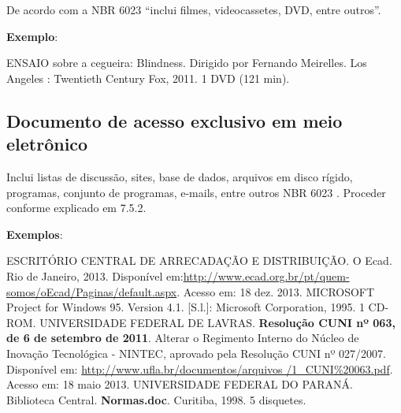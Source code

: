 De acordo com a NBR 6023 \cite[p.10]{NBR6023:2002} ``inclui filmes, videocassetes, DVD, entre outros''. 

\begin{flushleft}
\begin{singlespace}
\end{singlespace}
\end{flushleft}

\begin{exemplomanual}
\textbf{Exemplo}:\\
\begin{singlespace}
ENSAIO sobre a cegueira: Blindness. Dirigido por Fernando Meirelles. Los Angeles : Twentieth Century Fox, 2011. 1 DVD (121 min).
\end{singlespace}
\end{exemplomanual}


\subsection{Documento de acesso exclusivo em meio eletrônico}

Inclui listas de discussão, sites, base de dados, arquivos em disco rígido, programas, conjunto de programas, e-mails, entre outros NBR 6023 \cite{NBR6023:2002}. Proceder conforme explicado em 7.5.2.

\begin{flushleft}
\begin{singlespace}
\end{singlespace}
\end{flushleft}

\begin{exemplomanual}
\textbf{Exemplos}:\\
\begin{singlespace}
ESCRITÓRIO CENTRAL DE ARRECADAÇÃO E DISTRIBUIÇÃO. O Ecad. Rio de Janeiro, 2013. Disponível em:\url{http://www.ecad.org.br/pt/quem-somos/oEcad/Paginas/default.aspx}. Acesso em: 18 dez. 2013. MICROSOFT Project for Windows 95. Version 4.1. [S.l.]: Microsoft Corporation, 1995. 1 CD-ROM.
\newline
\newline
UNIVERSIDADE FEDERAL DE LAVRAS. \textbf{Resolução CUNI nº 063, de 6 de setembro de 2011}. Alterar o Regimento Interno do Núcleo de Inovação Tecnológica - NINTEC, aprovado pela Resolução CUNI nº 027/2007. Disponível em: \url{http://www.ufla.br/documentos/arquivos /1_CUNI\%20063.pdf}. Acesso em: 18 maio 2013.
\newline
\newline
UNIVERSIDADE FEDERAL DO PARANÁ. Biblioteca Central. \textbf{Normas.doc}. Curitiba, 1998. 5 disquetes.
\end{singlespace}
\end{exemplomanual}


